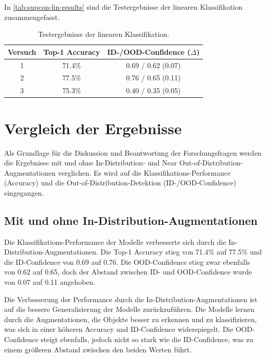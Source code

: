 In \autoref{tab:supcon-lin-results} sind die Testergebnisse der linearen Klassifikation zusammengefasst.

\begin{table}[h]
	\caption{Testergebnisse der linearen Klassifikation.}
	\begin{tabular}{|c|c|c|}
		\hline
		\textbf{Versuch} & \textbf{Top-1 Accuracy} & \textbf{ID-/OOD-Confidence ($\Delta$)} \\
		\hline
		1 & 71.4\% & 0.69 / 0.62 (0.07) \\
		2 & 77.5\% & 0.76 / 0.65 (0.11) \\
		3 & 75.3\% & 0.40 / 0.35 (0.05) \\
		\hline
	\end{tabular}
	\label{tab:supcon-lin-results}
\end{table}

\section{Vergleich der Ergebnisse} \label{sec:results-comparison}

Als Grundlage für die Diskussion und Beantwortung der Forschungsfragen werden die Ergebnisse mit und ohne In-Distribution- und Near Out-of-Distribution-Augmentationen verglichen. Es wird auf die Klassifikations-Performance (Accuracy) und die Out-of-Distribution-Detektion (ID-/OOD-Confidence) eingegangen.

\subsection{Mit und ohne In-Distribution-Augmentationen} \label{subsec:results-comparison-id}

Die Klassifikations-Performance der Modelle verbesserte sich durch die In-Distribution-Augmentationen. Die Top-1 Accuracy stieg von 71.4\% auf 77.5\% und die ID-Confidence von 0.69 auf 0.76. Die OOD-Confidence stieg zwar ebenfalls von 0.62 auf 0.65, doch der Abstand zwischen ID- und OOD-Confidence wurde von 0.07 auf 0.11 angehoben.

Die Verbesserung der Performance durch die In-Distribution-Augmentationen ist auf die bessere Generalisierung der Modelle zurückzuführen. Die Modelle lernen durch die Augmentationen, die Objekte besser zu erkennen und zu klassifizieren, was sich in einer höheren Accuracy und ID-Confidence widerspiegelt. Die OOD-Confidence steigt ebenfalls, jedoch nicht so stark wie die ID-Confidence, was zu einem größeren Abstand zwischen den beiden Werten führt.

